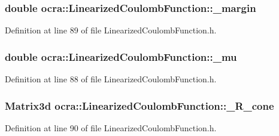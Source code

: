 \subsubsection[{\texorpdfstring{\+\_\+margin}{_margin}}]{\setlength{\rightskip}{0pt plus 5cm}double ocra\+::\+Linearized\+Coulomb\+Function\+::\+\_\+margin\hspace{0.3cm}{\ttfamily [protected]}}\hypertarget{classocra_1_1LinearizedCoulombFunction_abf137cc7ce5ea91ffa25a95feebddbd1}{}\label{classocra_1_1LinearizedCoulombFunction_abf137cc7ce5ea91ffa25a95feebddbd1}


Definition at line 89 of file Linearized\+Coulomb\+Function.\+h.

\subsubsection[{\texorpdfstring{\+\_\+mu}{_mu}}]{\setlength{\rightskip}{0pt plus 5cm}double ocra\+::\+Linearized\+Coulomb\+Function\+::\+\_\+mu\hspace{0.3cm}{\ttfamily [protected]}}\hypertarget{classocra_1_1LinearizedCoulombFunction_a18cfee3d5d056443d2fe1980b4899fa4}{}\label{classocra_1_1LinearizedCoulombFunction_a18cfee3d5d056443d2fe1980b4899fa4}


Definition at line 88 of file Linearized\+Coulomb\+Function.\+h.

\subsubsection[{\texorpdfstring{\+\_\+\+R\+\_\+cone}{_R_cone}}]{\setlength{\rightskip}{0pt plus 5cm}Matrix3d ocra\+::\+Linearized\+Coulomb\+Function\+::\+\_\+\+R\+\_\+cone\hspace{0.3cm}{\ttfamily [protected]}}\hypertarget{classocra_1_1LinearizedCoulombFunction_abf999f311e6563224a5ac852f44e7af4}{}\label{classocra_1_1LinearizedCoulombFunction_abf999f311e6563224a5ac852f44e7af4}


Definition at line 90 of file Linearized\+Coulomb\+Function.\+h.

